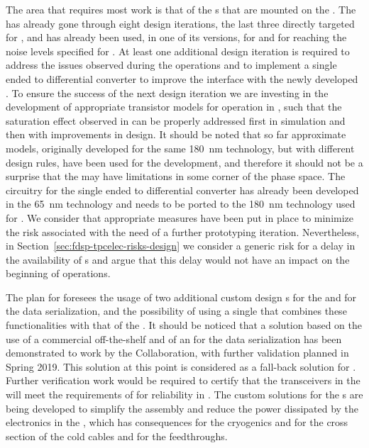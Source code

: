 The area that requires most work is that of the s that are mounted
on the . The   has already gone through eight design
iterations, the last three directly targeted for , and has already been used, 
in one of its versions, for  and for  reaching the 
noise levels specified for . At least one additional design iteration is
required to address the issues observed during the  operations and
to implement a single ended to differential converter to improve the interface
with the newly developed . To ensure the success of the next 
design iteration we are investing in the development of appropriate transistor
models for operation in \lar, such that the saturation effect observed in 
 can be properly addressed first in simulation and then with improvements 
in design. It should be noted that so far approximate models, originally developed for 
the same \SI{180}{nm} technology, but with different design rules, have been used for 
the  development, and therefore it should not be a surprise
that the   may have limitations in some corner of the phase space.
The circuitry for the single ended to differential converter has already been 
developed in the \SI{65}{nm} technology and needs to be ported to the \SI{180}{nm}
technology used for . We consider that appropriate measures have been
put in place to minimize the risk associated with the need of a further
prototyping iteration. Nevertheless, in Section~\ref{sec:fdsp-tpcelec-risks-design}
we consider a generic risk for a delay in the availability of s and
argue that this delay would not have an impact on the beginning of  operations.

The plan for  foresees the usage of two additional custom design s
for the  and for the data serialization, and the possibility of using a single 
 that combines these functionalities with that of the . It should
be noticed that a solution based on the use of a commercial off-the-shelf  
and of an  for the data serialization has been demonstrated to work by the 
 Collaboration, with further validation planned in Spring 2019. 
This solution at this point is considered as a fall-back
solution for . Further verification work would be required to certify that
the transceivers in the  will meet the requirements of  for reliability
in \lar. The custom solutions for the s are being developed to
simplify the  assembly and reduce the power dissipated by the
electronics in the \lar, which has consequences for the cryogenics and for
the cross section of the cold cables and for the feedthroughs.


